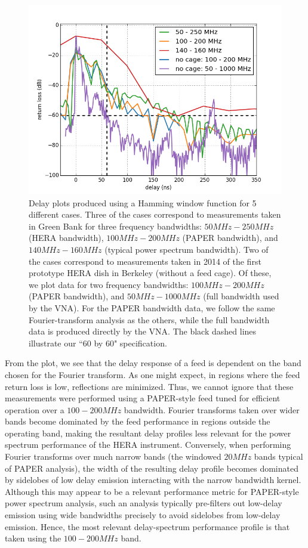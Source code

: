 \documentclass[12pt,preprint]{aastex}
\begin{document}
\begin{figure}[ht!]
\centering
\includegraphics[totalheight=0.41\textheight]{plots/delay3_window.png}
\caption{Delay plots produced using a Hamming window function for 5 different cases. Three of the cases correspond to measurements taken in Green Bank for three frequency bandwidths: $50MHz-250MHz$ (HERA bandwidth), $100MHz-200MHz$ (PAPER bandwidth), and $140MHz-160MHz$ (typical power spectrum bandwidth). Two of the cases correspond to measurements taken in 2014 of the first prototype HERA dish in Berkeley (without a feed cage). Of these, we plot data for two frequency bandwidths: $100MHz-200MHz$ (PAPER bandwidth), and $50MHz-1000MHz$ (full bandwidth used by the VNA). For the PAPER bandwidth data, we follow the same Fourier-transform analysis as the others, while the full bandwidth data is produced directly by the VNA. The black dashed lines illustrate our ``60 by 60" specification.}
\label{fig:3bands}
\end{figure} 

From the plot, we see that the delay response of a feed is dependent on the band chosen for the Fourier transform.  As one might expect, in regions
where the feed return loss is low, reflections are minimized.  Thus, we cannot ignore that these measurements were performed
using a PAPER-style feed tuned for efficient operation over a $100-200MHz$ bandwidth.  Fourier transforms taken over wider bands
become dominated by the feed performance in regions outside the operating band, making the resultant delay profiles less relevant
for the power spectrum performance of the HERA instrument.  Conversely, when performing Fourier transforms over much 
narrow bands (the windowed $20MHz$ bands typical of PAPER analysis), the width of the resulting delay profile
becomes dominated by sidelobes of low delay emission interacting with the narrow bandwidth kernel.  
Although this may appear to be a relevant performance metric
for PAPER-style power spectrum analysis, such an analysis typically pre-filters out low-delay emission using wide bandwidths precisely to avoid
sidelobes from low-delay emission.  Hence, the most relevant delay-spectrum performance profile is that taken using the $100-200MHz$ band.
\end{document}
